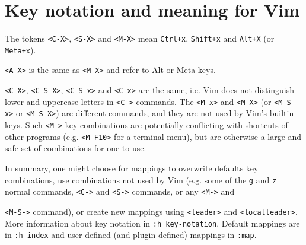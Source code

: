 \documentclass{article}
\newcommand{\ttt}[1] {
	\texttt{<#1>}}
\newcommand{\tttt}[1]{\texttt{#1}}
\begin{document}
\section{Key notation and meaning for Vim}
The tokens \ttt{C-X}, \ttt{S-X} and \ttt{M-X}
mean \tttt{Ctrl+x}, \tttt{Shift+x} and \tttt{Alt+X}
(or \tttt{Meta+x}).
\ttt{A-X} is the same as \ttt{M-X} and refer to
Alt or Meta keys.
\ttt{C-X}, \ttt{C-S-X}, \ttt{C-S-x}  and \ttt{C-x} are the same,
i.e. Vim does not distinguish lower and uppercase 
letters in \ttt{C-} commands.
The \ttt{M-x} and \ttt{M-X} (or \ttt{M-S-x} or \ttt{M-S-X})
are different commands,
and they are not used by Vim's builtin keys.
Such \ttt{M-} key combinations are potentially conflicting
with shortcuts of other programs (e.g. \ttt{M-F10} for a terminal menu),
but are otherwise a large and safe set of combinations
for one to use.

In summary,
one might choose for mappings to overwrite defaults key combinations,
use combinations not used by Vim (e.g. some of the \tttt{g} and \tttt{z}
normal commands, \ttt{C-} and \ttt{S-} commands, or any \ttt{M-} and
\ttt{M-S-} command), or
create new mappings using \tttt{<leader>} and \tttt{<localleader>}.
More information about key notation in \tttt{:h key-notation}.
Default mappings are in \tttt{:h index} and user-defined (and plugin-defined) mappings
in \tttt{:map}.
\end{document}
